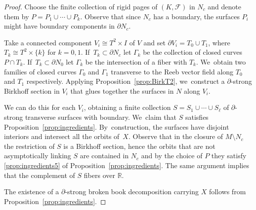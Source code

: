 \documentclass[10pt]{amsart}
\theoremstyle{definition}
\begin{document}
\begin{proof}
Choose the finite collection of rigid pages of $(K,\mathcal{F})$ in $N_c$ and denote them by $P=P_1\cup \cdots \cup P_k$. Observe that since $N_c$ has a boundary, the surfaces $P_i$ might have boundary components in $\partial N_c$.

Take a connected component $V_i\cong T^2\times I$ of $V$ and set $\partial V_i=T_0\cup T_1$, where $T_k\cong T^2\times \{k\}$ for $k=0,1$. If~$T_k \subset \partial N_c$ let $\Gamma_k$ be the collection of closed curves $P\cap T_k$. If~$T_k\subset \partial N_0$ let $\Gamma_k$ be the intersection of a fiber with $T_k$. We~obtain two families of closed curves $\Gamma_0$ and $\Gamma_1$ transverse to the Reeb vector field along $T_0$ and $T_1$ respectively. Applying Proposition~\ref{prop:BirkT2}, we~construct a $\partial$-strong Birkhoff section in $V_i$ that glues together the surfaces in $N$ along $V_i$.

We can do this for each $V_i$, obtaining a finite collection $S=S_1\cup\cdots \cup S_\ell$ of $\partial$\nobreakdash-strong transverse surfaces with boundary. We~claim that $S$ satisfies Proposition~\ref{prop:ingredients}. By~construction, the surfaces have disjoint interiors and intersect all the orbits of~$X$. Observe that in the closure of $M\setminus N_c$ the restriction of $S$ is a Birkhoff section, hence the orbits that are not asymptotically linking $S$ are contained in $N_c$ and by the choice of $P$ they satisfy \eqref{prop:ingredients5} of Proposition~\ref{prop:ingredients}. The same argument implies that the complement of $S$ fibers over $\mathbb{R}$.

The existence of a $\partial$-strong broken book decomposition carrying $X$ follows from Proposition~\ref{prop:ingredients}.


\end{proof}
\end{document}
